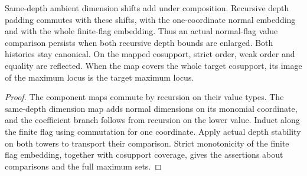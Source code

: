 \begin{theorem}
\label{hir:g1-normal-flag-depth-padding}
\leanok
Same-depth ambient dimension shifts add under composition.
Recursive depth padding commutes with these shifts, with the
one-coordinate normal embedding and with the whole finite-flag
embedding. Thus an actual normal-flag value comparison persists
when both recursive depth bounds are enlarged. Both histories stay
canonical. On the mapped cosupport, strict order, weak order and
equality are reflected. When the map covers the whole target
cosupport, its image of the maximum locus is the target maximum
locus.
\end{theorem}
\begin{proof}
The component maps commute by recursion on their value types. The
same-depth dimension map adds normal dimensions on its monomial
coordinate, and the coefficient branch follows from recursion on
the lower value. Induct along the finite flag using commutation
for one coordinate. Apply actual depth stability on both towers
to transport their comparison. Strict monotonicity of the finite
flag embedding, together with cosupport coverage, gives the
assertions about comparisons and the full maximum sets.
\end{proof}

